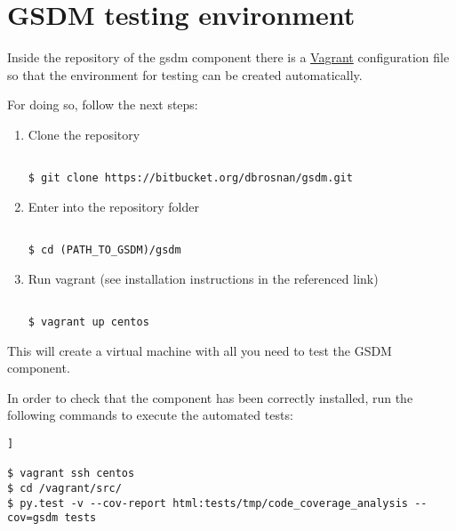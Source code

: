\chapter{GSDM testing environment}\label{c:install_gsdm}

Inside the repository of the \acrshort{gsdm} component there is a \href{https://www.vagrantup.com/}{Vagrant} configuration file so that the environment for testing can be created automatically.

For doing so, follow the next steps:

\begin{enumerate}

\item Clone the repository

\begin{lstlisting}[breaklines=true, style=bash]

$ git clone https://bitbucket.org/dbrosnan/gsdm.git

\end{lstlisting}

\item Enter into the repository folder

\begin{lstlisting}[breaklines=true, style=bash]

$ cd (PATH_TO_GSDM)/gsdm

\end{lstlisting}

\item Run vagrant (see installation instructions in the referenced link)

\begin{lstlisting}[breaklines=true, style=bash]

$ vagrant up centos

\end{lstlisting}

\end{enumerate}

This will create a virtual machine with all you need to test the GSDM component.

In order to check that the component has been correctly installed, run the following commands to execute the automated tests:

\begin{lstlisting}[breaklines=true, style=bash]]

$ vagrant ssh centos
$ cd /vagrant/src/
$ py.test -v --cov-report html:tests/tmp/code_coverage_analysis --cov=gsdm tests

\end{lstlisting}

